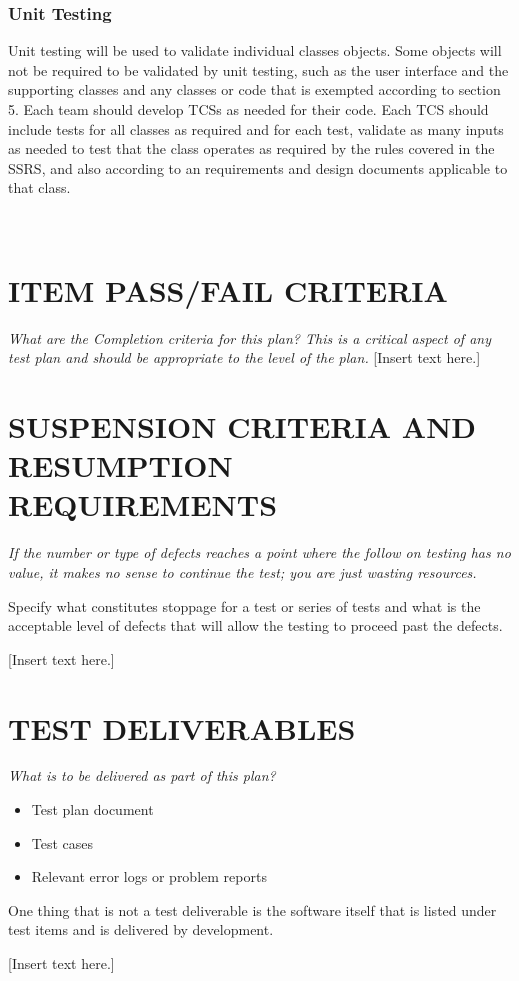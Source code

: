 {{\subsubsection{Unit Testing}
Unit testing will be used to validate individual classes objects. Some objects will not be required to be validated by unit testing, such as the user interface and the supporting classes and any classes or code that is exempted according to section 5.
Each team should develop TCSs as needed for their code. Each TCS should include tests for all classes as required and for each test, validate as many inputs as needed to test that the class operates as required by the rules covered in the SSRS, and also according to an requirements and design documents applicable to that class.

\

}

\section[ITEM PASS/FAIL CRITERIA]{\bfseries\color{black}
	 ITEM PASS/FAIL CRITERIA}
{\itshape\color{black}
What are the Completion criteria for this plan? This is a critical
aspect of any test plan and should be appropriate to the level of the plan.
}
{\color{black}
[Insert text here.]}

\section[SUSPENSION CRITERIA]{\bfseries\color{black}
	 SUSPENSION CRITERIA AND RESUMPTION REQUIREMENTS}
{\itshape\color{black}
If the number or type of defects reaches a point where the follow on
testing has no value, it makes no sense to continue the test; you are
just wasting resources.

Specify what constitutes stoppage for a test or series of tests and
what is the acceptable level of defects that will allow the testing to
proceed past the defects. 
}
{\color{black}
[Insert text here.]}

\section[TEST DELIVERABLES]{\bfseries\color{black} TEST DELIVERABLES}
{\itshape\color{black}
What is to be delivered as part of this plan?

\begin{itemize}
\item Test plan document
\item Test cases
\item Relevant error logs or problem reports
\end{itemize}
One thing that is not a test deliverable is the software itself that
is listed under test items and is delivered by development.
}
{\color{black}
[Insert text here.]}

}
